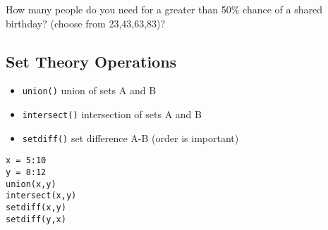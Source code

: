\documentclass[a4paper,12pt]{article}
\begin{document}
How many people do you need for a greater than 50\% chance of a shared birthday? (choose from 23,43,63,83)?

\subsection{Set Theory Operations}
\begin{itemize}
\item \texttt{union()} union of sets A and B
\item \texttt{intersect()} intersection of sets A and B
\item \texttt{setdiff()} set difference A-B (order is important)
\end{itemize}

\begin{framed}
\begin{verbatim}
x = 5:10
y = 8:12
union(x,y)
intersect(x,y)
setdiff(x,y)
setdiff(y,x)
\end{verbatim}
\end{framed}
\end{document}
